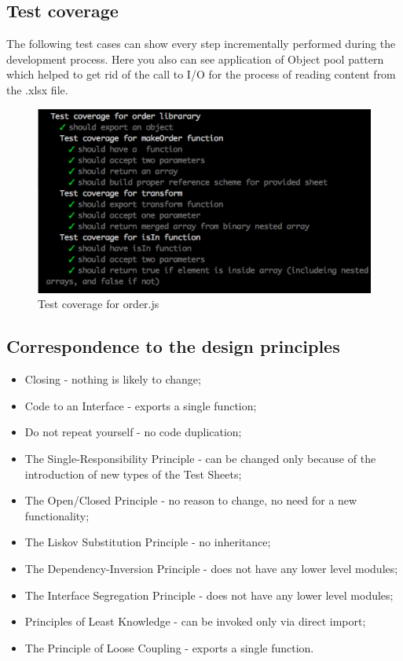 \subsection{Test coverage}

The following test cases can show every step incrementally performed during the development process. Here you also can see application of Object pool pattern which helped to get rid of the call to I/O for the process of reading content from the .xlsx file.
\begin{figure}[H]
	\centering
	\includegraphics[width=\linewidth]{grafiken/testOrder.png}
	\caption{Test coverage for order.js}
	\label{fig:testOrder}
\end{figure}

\subsection{Correspondence to  the design principles}
\begin{itemize}
	\item Closing - nothing is likely to change;
	\item Code to an Interface - exports a single function;
	\item Do not repeat yourself - no code duplication;
	\item The Single-Responsibility Principle - can be changed only because of the introduction of new types of the Test Sheets;
	\item The Open/Closed Principle - no reason to change, no need for a new functionality;
	\item The Liskov Substitution Principle - no inheritance;
	\item The Dependency-Inversion Principle - does not have any lower level modules;
	\item The Interface Segregation Principle - does not have any lower level modules;
	\item Principles of Least Knowledge -  can be invoked only via direct import;
	\item The Principle of Loose Coupling - exports a single function.
\end{itemize}

